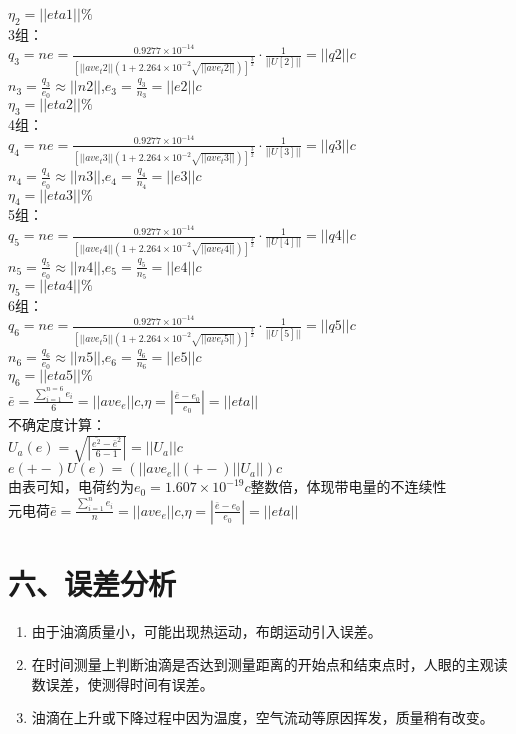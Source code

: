\indent $\eta_2=||eta1||\%$\\
3组：\\
\indent $q_{3}=ne=\frac{0.9277\times10^{-14}}
{\left[||ave_t2||\left(1+2.264\times10^{-2}\sqrt{||ave_t2||}\right)\right]^\frac{3}{2}}
\cdot\frac{1}{||U[2]||}=||q2||c$\\
\indent $n_3=\frac{q_3}{e_0}\approx||n2||$,\quad$e_3=\frac{q_3}{n_3}=||e2||c$\\
\indent $\eta_3=||eta2||\%$\\
4组：\\
\indent $q_{4}=ne=\frac{0.9277\times10^{-14}}
{\left[||ave_t3||\left(1+2.264\times10^{-2}\sqrt{||ave_t3||}\right)\right]^\frac{3}{2}}
\cdot\frac{1}{||U[3]||}=||q3||c$\\
\indent $n_4=\frac{q_4}{e_0}\approx||n3||$,\quad$e_4=\frac{q_4}{n_4}=||e3||c$\\
\indent $\eta_4=||eta3||\%$\\
5组：\\
\indent $q_{5}=ne=\frac{0.9277\times10^{-14}}
{\left[||ave_t4||\left(1+2.264\times10^{-2}\sqrt{||ave_t4||}\right)\right]^\frac{3}{2}}
\cdot\frac{1}{||U[4]||}=||q4||c$\\
\indent $n_5=\frac{q_5}{e_0}\approx||n4||$,\quad$e_5=\frac{q_5}{n_5}=||e4||c$\\
\indent $\eta_5=||eta4||\%$\\
6组：\\
\indent $q_{6}=ne=\frac{0.9277\times10^{-14}}
{\left[||ave_t5||\left(1+2.264\times10^{-2}\sqrt{||ave_t5||}\right)\right]^\frac{3}{2}}
\cdot\frac{1}{||U[5]||}=||q5||c$\\
\indent $n_6=\frac{q_6}{e_0}\approx||n5||$,\quad$e_6=\frac{q_6}{n_6}=||e5||c$\\
\indent $\eta_6=||eta5||\%$\\
$\bar{e}=\frac{\sum_{i=1}^{n=6} e_i}{6}=||ave_e||c$,\quad$\eta=|\frac{\bar{e}-e_0}{e_0}|=||eta||$\\
不确定度计算：\\
\indent $U_a(e)=\sqrt{|\frac{\bar{e^2}-\bar{e}^2}{6-1}|}=||U_a||c$\\
\indent $e(+-)U(e)=\left(||ave_e||(+-)||U_a||\right)c$\\
\indent 由表可知，电荷约为$e_0=1.607\times10^{-19}c$整数倍，体现带电量的不连续性\\
\indent 元电荷$\bar{e}=\frac{\sum_{i=1}^{n} e_i}{n}=||ave_e||c$,\quad$\eta=|\frac{\bar{e}-e_0}{e_0}|=||eta||$
\section*{六、误差分析}
\begin{enumerate}
\item 由于油滴质量小，可能出现热运动，布朗运动引入误差。
\item 在时间测量上判断油滴是否达到测量距离的开始点和结束点时，人眼的主观读数误差，使测得时间有误差。
\item 油滴在上升或下降过程中因为温度，空气流动等原因挥发，质量稍有改变。
\end{enumerate}
